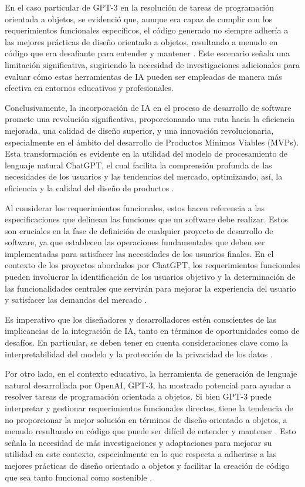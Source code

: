 En el caso particular de GPT-3 en la resolución de tareas de programación orientada a objetos, se evidenció que, aunque era capaz de cumplir con los requerimientos funcionales específicos, el código generado no siempre adhería a las mejores prácticas de diseño orientado a objetos, resultando a menudo en código que era desafiante para entender y mantener \citep{Cipriano2023GPT-3Report}. Este escenario señala una limitación significativa, sugiriendo la necesidad de investigaciones adicionales para evaluar cómo estas herramientas de IA pueden ser empleadas de manera más efectiva en entornos educativos y profesionales.

Conclusivamente, la incorporación de IA en el proceso de desarrollo de software promete una revolución significativa, proporcionando una ruta hacia la eficiencia mejorada, una calidad de diseño superior, y una innovación revolucionaria, especialmente en el ámbito del desarrollo de Productos Mínimos Viables (MVPs). Esta transformación es evidente en la utilidad del modelo de procesamiento de lenguaje natural ChatGPT, el cual facilita la comprensión profunda de las necesidades de los usuarios y las tendencias del mercado, optimizando, así, la eficiencia y la calidad del diseño de productos \citep{Wu2023AgileDesign}.

Al considerar los requerimientos funcionales, estos hacen referencia a las especificaciones que delinean las funciones que un software debe realizar. Estos son cruciales en la fase de definición de cualquier proyecto de desarrollo de software, ya que establecen las operaciones fundamentales que deben ser implementadas para satisfacer las necesidades de los usuarios finales. En el contexto de los proyectos abordados por ChatGPT, los requerimientos funcionales pueden involucrar la identificación de los usuarios objetivo y la determinación de las funcionalidades centrales que servirán para mejorar la experiencia del usuario y satisfacer las demandas del mercado \citep{Wu2023AgileDesign}.

Es imperativo que los diseñadores y desarrolladores estén conscientes de las implicancias de la integración de IA, tanto en términos de oportunidades como de desafíos. En particular, se deben tener en cuenta consideraciones clave como la interpretabilidad del modelo y la protección de la privacidad de los datos \citep{Wu2023AgileDesign}.

Por otro lado, en el contexto educativo, la herramienta de generación de lenguaje natural desarrollada por OpenAI, GPT-3, ha mostrado potencial para ayudar a resolver tareas de programación orientada a objetos. Si bien GPT-3 puede interpretar y gestionar requerimientos funcionales directos, tiene la tendencia de no proporcionar la mejor solución en términos de diseño orientado a objetos, a menudo resultando en código que puede ser difícil de entender y mantener \citep{Cipriano2023GPT-3Report}. Esto señala la necesidad de más investigaciones y adaptaciones para mejorar su utilidad en este contexto, especialmente en lo que respecta a adherirse a las mejores prácticas de diseño orientado a objetos y facilitar la creación de código que sea tanto funcional como sostenible \citep{Cipriano2023GPT-3Report}.


